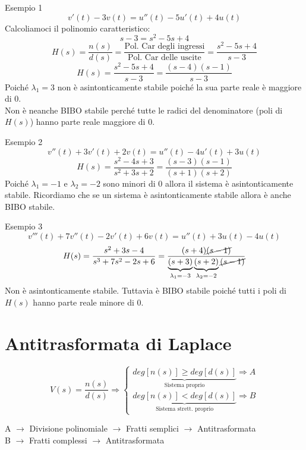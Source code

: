 \documentclass[a4paper]{article}
\theoremstyle{definition}
\theoremstyle{remark}
\begin{document}
\begin{examplebox}{Esempio 1}
    \[v'(t) - 3v(t) = u''(t) - 5u'(t) + 4u(t)\]
    Calcoliamoci il polinomio caratteristico:
    \[s - 3 = s^2 - 5s + 4\]
    \[H(s) = \frac{n(s)}{d(s)} = \frac{\text{Pol. Car degli ingressi}}{\text{Pol. Car delle uscite}} = \frac{s^2 -5s + 4}{s - 3}\]
    \[H(s) = \frac{s^2 - 5s + 4}{s - 3} = \frac{(s-4)(s-1)}{s-3}\]
    Poiché $\lambda_1 = 3$ non è asintonticamente stabile poiché la sua parte reale è maggiore di 0.\\ Non è neanche BIBO stabile
    perché tutte le radici del denominatore (poli di $H(s)$) hanno parte reale maggiore di 0.
\end{examplebox}
\begin{examplebox}{Esempio 2}
    \[v''(t) + 3v'(t) + 2v(t) = u''(t) - 4u'(t) + 3u(t)\]
    \[H(s) = \frac{s^2 - 4s + 3}{s^2 + 3s + 2} = \frac{(s-3)(s-1)}{(s+1)(s+2)}\]
    Poiché $\lambda_1 = -1$ e $\lambda_2 = -2$ sono minori di 0 allora il sistema è asintonticamente stabile. Ricordiamo che se un sistema è 
    asintonticamente stabile allora è anche BIBO stabile.
\end{examplebox}
 \begin{examplebox}{Esempio 3}
    \[v'''(t) + 7v''(t) - 2v'(t) + 6v(t) = u''(t) + 3u(t) - 4u(t)\]
    \[H(s) = \frac{s^2 + 3s - 4}{s^3 + 7s^2 - 2s + 6} = \frac{(s+4)\cancel{(s-1)}}{\underbrace{(s+3)}_{\lambda_1 = -3}\underbrace{(s+2)}_{\lambda_2 = -2}\cancel{(s-1)}}\]
    Non è asintonticamente stabile. Tuttavia è BIBO stabile poiché tutti i poli di $H(s)$ hanno parte reale minore di 0.
 \end{examplebox}

\section{Antitrasformata di Laplace}

\[V(s) = \frac{n(s)}{d(s)} \Longrightarrow \begin{cases}
    \underbrace{deg[n(s)] \ge deg[d(s)]}_{\text{Sistema proprio}} \Longrightarrow A\\
    \underbrace{deg[n(s)] < deg[d(s)]}_{\text{Sistema strett. proprio}} \Longrightarrow B
\end{cases}\]

\begin{center}
    A $\rightarrow$ Divisione polinomiale $\rightarrow$ Fratti semplici $\rightarrow$ Antitrasformata\\
    B $\rightarrow$ Fratti complessi $\rightarrow$ Antitrasformata
\end{center}
\end{document}
